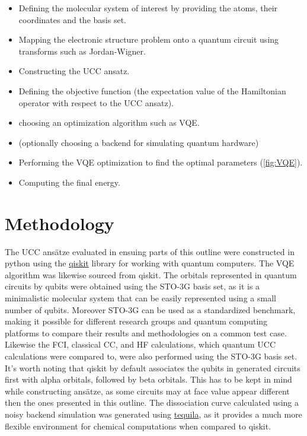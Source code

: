 \documentclass[twoside,twocolumn,9pt]{article}
\begin{document}
{\begin{itemize}
  \item Defining the molecular system of interest by providing the atoms, their coordinates and the basis set.
  \item Mapping the electronic structure problem onto a quantum circuit using transforms such as Jordan-Wigner.
  \item Constructing the UCC ansatz.
  \item Defining the objective function (the expectation value of the Hamiltonian operator with respect to the UCC ansatz).
  \item choosing an optimization algorithm such as VQE.
  \item (optionally choosing a backend for simulating quantum hardware)
  \item Performing the VQE optimization to find the optimal parameters (\cref{fig:VQE}).
  \item Computing the final energy.
\end{itemize}

\section{Methodology}

The UCC ansätze evaluated in ensuing parts of this outline were constructed in python using the \href{https://qiskit.org/}{qiskit} library for working with quantum computers. The VQE algorithm was likewise sourced from qiskit. The orbitals represented in quantum circuits by qubits were obtained using the STO-3G basis set, as it is a minimalistic molecular system that can be easily represented using a small number of qubits. Moreover STO-3G can be used as a standardized benchmark, making it possible for different research groups and quantum computing platforms to compare their results and methodologies on a common test case. Likewise the FCI, classical CC, and HF calculations, which quantum UCC calculations were compared to, were also performed using the STO-3G basis set. It's worth noting that qiskit by default associates the qubits in generated circuits first with alpha orbitals, followed by beta orbitals. This has to be kept in mind while constructing ansätze, as some circuits may at face value appear different then the ones presented in this outline. The dissociation curve calculated using a noisy backend simulation was generated using \href{https://github.com/tequilahub/tequila}{tequila}, as it provides a much more flexible environment for chemical computations when compared to qiskit.

}
\end{document}
